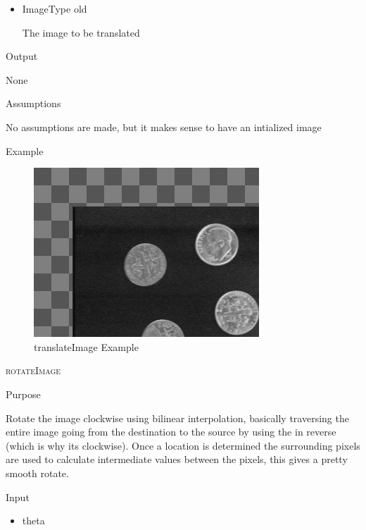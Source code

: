 \documentclass[pdftex, 11pt]{article}
\begin{document}
\begin{description}
\begin{description}
\begin{itemize}
					\item{ImageType old}

						The image to be translated

				\end{itemize}

			\item{Output}

				None

			\item{Assumptions}

				No assumptions are made, but it makes sense to have
				an intialized image

			\item{Example}

				\begin{figure}[h]
					\centering
					\caption{translateImage Example}
				\includegraphics{images/outtrans.png}
			\end{figure}

		\end{description}


	\item{\textsc{rotateImage}}
		\begin{description}
			\item{Purpose}

				Rotate the image clockwise using bilinear
				interpolation, basically traversing
				the entire image going from the destination 
				to the source by using the
				in reverse (which is why its clockwise). 
				Once a location is determined the
				surrounding pixels are used to calculate 
				intermediate values between the
				pixels, this gives a pretty smooth rotate.

			\item{Input}

				\begin{itemize}

					\item{theta}


\end{itemize}
\end{description}
\end{description}
\end{document}
